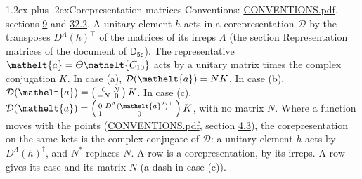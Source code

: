 \documentclass[10pt,a4paper]{article}
\makeatletter
\renewcommand\section{\@startsection{section}{1}{\z@}{-3ex plus -1ex minus -.2ex}%
  {1.2ex plus .2ex}{\normalfont\large\sffamily\bfseries\color{parttitle}}}
\numberwithin{equation}{section}
\newcommand{\eltfont}[1]{{\let\sigma\eltsigma\mathelt{#1}}}
\newcommand{\grp}[1]{\mathsf{#1}}
\newcommand{\elt}[1]{\eltfont{#1}}
\makeatother
\begin{document}
\section{Corepresentation matrices}\label{s:corep_matrices}
Conventions: \href{../../CONVENTIONS.pdf}{CONVENTIONS.pdf}, sections \href{../../../rotation/CONVENTIONS.pdf\#conv.9}{9} and \href{../../CONVENTIONS.pdf\#conv.32.2}{32.2}.
A unitary element $h$ acts in a corepresentation $\mathcal{D}$ by the transposes $D^{\Lambda}(h)^{\top}$ of the matrices of its irreps $\Lambda$ (the section Representation matrices of the document of \href{../../../rotation/data/pdf/D5d.pdf}{$\grp{D_{5d}}$}). The representative $\elt{a} = \varTheta\elt{C_{10}}$ acts by a unitary matrix times the complex conjugation $K$.
In case (a), $\mathcal{D}(\elt{a}) = NK$. In case (b), $\mathcal{D}(\elt{a}) = \left(\begin{smallmatrix} 0 & N \\ -N & 0 \end{smallmatrix}\right) K$. In case (c), $\mathcal{D}(\elt{a}) = \left(\begin{smallmatrix} 0 & D^{\Lambda}(\elt{a}^2)^{\top} \\ 1 & 0 \end{smallmatrix}\right) K$, with no matrix $N$.
Where a function moves with the points (\href{../../CONVENTIONS.pdf}{CONVENTIONS.pdf}, section \href{../../../rotation/CONVENTIONS.pdf\#conv.4.3}{4.3}), the corepresentation on the same kets is the complex conjugate of $\mathcal{D}$: a unitary element $h$ acts by $D^{\Lambda}(h)^{\dagger}$, and $N^{*}$ replaces $N$.
A row is a corepresentation, by its irreps. A row gives its case and its matrix $N$ (a dash in case (c)).
\end{document}
